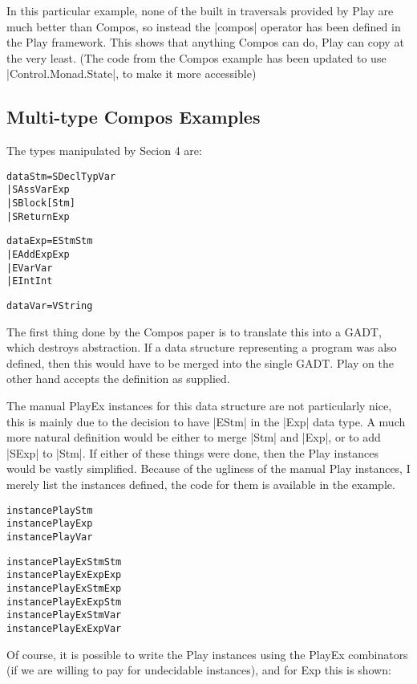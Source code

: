 \documentclass[preprint]{sigplanconf}
\newenvironment{code}{\begin{alltt}\small}{\end{alltt}}
\begin{document}
    In this particular example, none of the built in traversals provided by Play are much better than Compos, so instead the |compos| operator has been defined in the Play framework. This shows that anything Compos can do, Play can copy at the very least. (The code from the Compos example has been updated to use |Control.Monad.State|, to make it more accessible)



\subsection{Multi-type Compos Examples}



    The types manipulated by Secion 4 are:

\begin{code}
data Stm = SDecl Typ Var
         | SAss  Var Exp
         | SBlock [Stm]
         | SReturn Exp

data Exp = EStm Stm
         | EAdd Exp Exp
         | EVar Var
         | EInt Int

data Var = V String

\end{code}

    The first thing done by the Compos paper is to translate this into a GADT, which destroys abstraction. If a data structure representing a program was also defined, then this would have to be merged into the single GADT. Play on the other hand accepts the definition as supplied.


    The manual PlayEx instances for this data structure are not particularly nice, this is mainly due to the decision to have |EStm| in the |Exp| data type. A much more natural definition would be either to merge |Stm| and |Exp|, or to add |SExp| to |Stm|. If either of these things were done, then the Play instances would be vastly simplified. Because of the ugliness of the manual Play instances, I merely list the instances defined, the code for them is available in the example.

\begin{code}
instance Play Stm
instance Play Exp
instance Play Var

instance PlayEx Stm Stm
instance PlayEx Exp Exp
instance PlayEx Stm Exp
instance PlayEx Exp Stm
instance PlayEx Stm Var
instance PlayEx Exp Var
\end{code}

    Of course, it is possible to write the Play instances using the PlayEx combinators (if we are willing to pay for undecidable instances), and for Exp this is shown:
\end{document}
